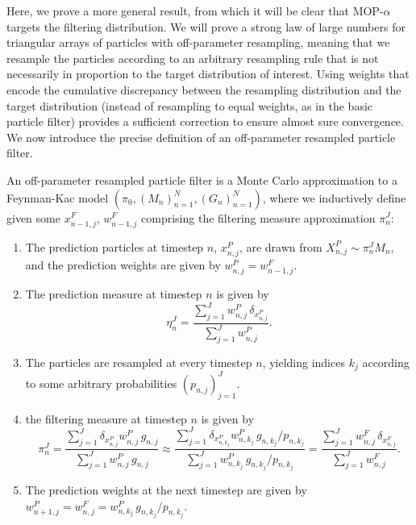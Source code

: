 

Here, we prove a more general result, from which it will be clear that MOP-$\alpha$ targets the filtering distribution. 
We will prove a strong law of large numbers for triangular arrays of particles with off-parameter resampling, meaning that we resample the particles according to an arbitrary resampling rule that is not necessarily in proportion to the target distribution of interest. 
Using weights that encode the cumulative discrepancy between the resampling distribution and the target distribution (instead of resampling to equal weights, as in the basic particle filter) provides a sufficient correction to ensure almost sure convergence.
We now introduce the precise definition of an off-parameter resampled particle filter. 

\begin{defn}
    \label{defn:off-parameter-filter}
    An off-parameter resampled particle filter is a Monte Carlo approximation to a Feynman-Kac model $\left(\pi_0,\left(M_n\right)_{n=1}^N,\left(G_n\right)_{n=1}^N\right)$, where we inductively define given some $x_{n-1,j}^F$, $w_{n-1,j}^F$ comprising the filtering measure approximation $\pi_n^J$:
    \begin{enumerate}
        \item The prediction particles at timestep $n$, $x_{n,j}^P$, are drawn from $X_{n,j}^P \sim \pi_n^J M_n$, and the prediction weights are given by $w_{n,j}^P = w_{n-1,j}^F$. 
        \item The prediction measure at timestep $n$ is given by 
        \begin{equation}
        \eta_n^J = \frac{\sum_{j=1}^J w_{n,j}^P \, \delta_{x_{n,j}^P}}{\sum_{j=1}^J w_{n,j}^P}.
        \end{equation}
        \item The particles are resampled at every timestep $n$, yielding indices $k_j$ according to some arbitrary probabilities $(p_{n,j})_{j=1}^J$.
        \item the filtering measure at timestep $n$ is given by
        \begin{equation}
        \pi_n^J = \frac{\sum_{j=1}^J \delta_{x_{n,j}^P } w_{n,j}^P \, g_{n,j}}{\sum_{j=1}^J w_{n,j}^P \, g_{n,j}} \approx \frac{\sum_{j=1}^J \delta_{x_{n,k_j}^P }w_{n,k_j}^P \, g_{n,k_j}\big/p_{n,k_j}}{\sum_{j=1}^J w_{n,k_j}^P\, g_{n,k_j}\big/p_{n,k_j}} = \frac{\sum_{j=1}^J w_{n,j}^F \, \delta_{x_{n,j}^F}}{\sum_{j=1}^J w_{n,j}^F}.
        \end{equation}
        \item The prediction weights at the next timestep are given by $w_{n+1,j}^P = w_{n,j}^F =  w_{n,k_j}^P \, g_{n,k_j}\big/p_{n,k_j}$.
    \end{enumerate}
\end{defn}

